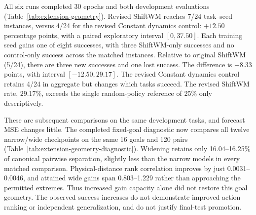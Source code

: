 All six runs completed 30 epochs and both development evaluations
(Table~\ref{tab:extension-geometry}). Revised ShiftWM reaches 7/24
task--seed instances, versus 4/24 for the revised Constant dynamics
control: $+12.50$ percentage points, with a paired exploratory interval
$[0,37.50]$. Each training seed gains one of eight successes, with three
ShiftWM-only successes and no control-only success across the matched
instances. Relative to original ShiftWM (5/24), there are three new
successes and one lost success. The difference is $+8.33$ points,
with interval $[-12.50,29.17]$. The revised Constant dynamics control retains 4/24 in aggregate
but changes which tasks succeed. The revised ShiftWM rate, 29.17\%,
exceeds the single random-policy reference of 25\% only descriptively.

These are subsequent comparisons on the same development tasks, and
forecast MSE changes little. The completed fixed-goal diagnostic now
compares all twelve narrow/wide checkpoints on the same 16 goals and
120 pairs (Table~\ref{tab:extension-geometry-diagnostic}). Widening retains
only 16.04--16.25\% of canonical pairwise separation, slightly less than
the narrow models in every matched comparison. Physical-distance rank
correlation improves by just 0.0031--0.0046, and attained wide gains span
0.803--1.229 rather than approaching the permitted extremes.
Thus increased gain capacity alone did not restore this goal geometry.
The observed success increases do not demonstrate improved action ranking
or independent generalization, and do not justify final-test promotion.



\begin{table}[H]
\centering\small
\setlength{\tabcolsep}{4pt}
\caption{\textbf{Completed observation-gain ablation on drone development.}
Original and revised transformer conditions share data, optimization,
validation selection, eight physical tasks, support and planner budget.
The six revised models use seeds 0, 1 and 2. Absolute scores are consolidated
in Table~\ref{tab:extension-drone}; this table retains
paired crossed-bootstrap success differences. All intervals include or
touch zero.  marks positive point estimates
only. This follow-up ablation is exploratory, not an independent test
of the geometry hypothesis.}
\label{tab:extension-geometry}
\end{table}

